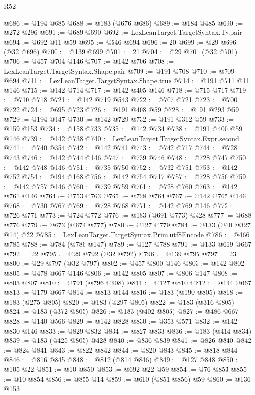 \begin{lexlean}{R52}
\begin{coremodule}
{{{{{{{{{{{{{{{{{{{{{{{{{{{{{{{{{{{{{{{{{{{{{{{{{{{{{{{{{{{{{{{{{{{{{{{{{{{{{{{{{{{{{{{{{{{{{{{{{{{{{{{{{{{{{{{{{{{{{{{{{{{{{{{{{{{{{{{{{{{{{{{{{{{{{{{{{{{{{{{{{{{{{{{{{{{{{{{{{{{{{{{{{{{{{{{{{{{{{{@686 := @194 @685
@688 := @183 (@676 @686)
@689 := @184 @485
@690 := @272 @296
@691 := @689 @690
@692 := LexLeanTarget.TargetSyntax.Ty.pair
@694 := @692 @11 @59
@695 := @546 @694
@696 := 20
@699 := @29 @696 (@32 @696)
@700 := @139 @699
@701 := 21
@704 := @29 @701 (@32 @701)
@706 := @457 @704 @146
@707 := @142 @706
@708 := LexLeanTarget.TargetSyntax.Shape.pair
@709 := @191 @708
@710 := @709 @694
@711 := LexLeanTarget.TargetSyntax.Shape.true
@714 := @191 @711 @11 @146
@715 := @142 @714
@717 := @142 @405 @146
@718 := @715 @717
@719 := @710 @718
@721 := @142 @719 @543
@722 := @707 @721
@723 := @700 @722
@724 := @695 @723
@726 := @191 @408 @59
@728 := @191 @293 @59
@729 := @194 @147
@730 := @142 @729
@732 := @191 @312 @59
@733 := @159 @153
@734 := @158 @733
@735 := @142 @734
@738 := @191 @400 @59 @146
@739 := @142 @738
@740 := LexLeanTarget.TargetSyntax.Expr.second
@741 := @740 @354
@742 := @142 @741
@743 := @742 @717
@744 := @728 @743
@746 := @142 @744 @146
@747 := @739 @746
@748 := @728 @747
@750 := @142 @748 @146
@751 := @735 @750
@752 := @732 @751
@753 := @142 @752
@754 := @194 @168
@756 := @142 @754 @717
@757 := @728 @756
@759 := @142 @757 @146
@760 := @739 @759
@761 := @728 @760
@763 := @142 @761 @146
@764 := @753 @763
@765 := @728 @764
@767 := @142 @765 @146
@768 := @730 @767
@769 := @728 @768
@771 := @142 @769 @146
@772 := @726 @771
@773 := @724 @772
@776 := @183 (@691 @773) @428
@777 := @688 @776
@779 := @673 (@674 @777)
@780 := @127 @779
@784 := @133 (@10 @327 @14) @22
@785 := LexLeanTarget.TargetSyntax.Prim.utf8Encode
@786 := @466 @785
@788 := @784 (@786 @147)
@789 := @127 @788
@791 := @133 @669 @667
@792 := 22
@795 := @29 @792 (@32 @792)
@796 := @139 @795
@797 := 23
@800 := @29 @797 (@32 @797)
@802 := @457 @800 @146
@803 := @142 @802
@805 := @478 @667 @146
@806 := @142 @805
@807 := @806 @147
@808 := @803 @807
@810 := @791 (@796 @808)
@811 := @127 @810
@812 := @134 @667
@813 := @179 @667
@814 := @813 @144
@816 := @183 (@190 @805)
@818 := @183 (@275 @805)
@820 := @183 (@297 @805)
@822 := @183 (@316 @805)
@824 := @183 (@372 @805)
@826 := @183 (@402 @805)
@827 := @486 @667
@828 := @140 @566
@829 := @142 @828
@830 := @353 @571
@832 := @142 @830 @146
@833 := @829 @832
@834 := @827 @833
@836 := @183 (@414 @834)
@839 := @183 (@425 @805) @428
@840 := @836 @839
@841 := @826 @840
@842 := @824 @841
@843 := @822 @842
@844 := @820 @843
@845 := @818 @844
@846 := @816 @845
@848 := @812 (@814 @846)
@849 := @127 @848
@850 := @105 @22
@851 := @10 @850
@853 := @692 @22 @59
@854 := @76 @853
@855 := @10 @854
@856 := @855 @14
@859 := @610 (@851 @856) @59
@860 := @136 @153
}}}}}}}}}}}}}}}}}}}}}}}}}}}}}}}}}}}}}}}}}}}}}}}}}}}}}}}}}}}}}}}}}}}}}}}}}}}}}}}}}}}}}}}}}}}}}}}}}}}}}}}}}}}}}}}}}}}}}}}}}}}}}}}}}}}}}}}}}}}}}}}}}}}}}}}}}}}}}}}}}}}}}}}}}}}}}}}}}}}}}}}}}}}}}}}}}}}}}}
\end{coremodule}
\end{lexlean}
